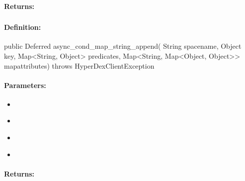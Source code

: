 \paragraph{Returns:}


\pagebreak
\subsubsection{}
\label{api:java:async_cond_map_string_append}


\paragraph{Definition:}
\begin{javacode}
public Deferred async_cond_map_string_append(
        String spacename,
        Object key,
        Map<String, Object> predicates,
        Map<String, Map<Object, Object>> mapattributes) throws HyperDexClientException
\end{javacode}

\paragraph{Parameters:}
\begin{itemize}[noitemsep]
\item {}\\

\item {}\\

\item {}\\

\item {}\\

\end{itemize}

\paragraph{Returns:}


